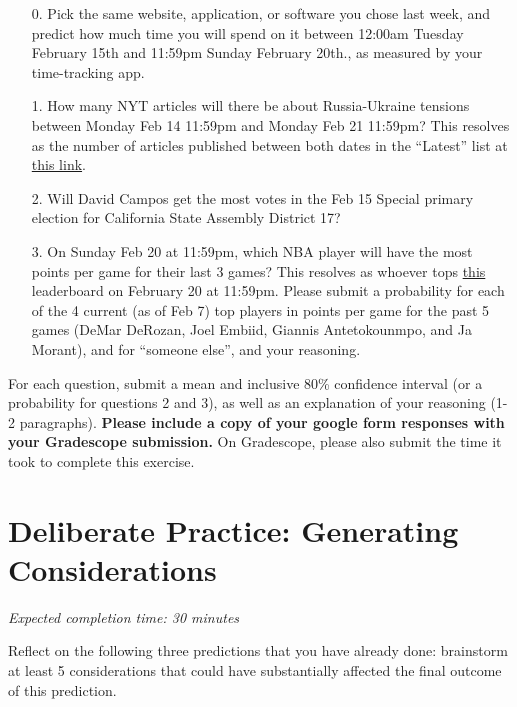 \documentclass[11pt]{article}
\begin{document}
\begin{enumerate}
	\item[0.] Pick the same website, application, or software you chose last week, and predict how much time you will spend on it between 12:00am Tuesday February 15th and 11:59pm Sunday February 20th., as measured by your time-tracking app.

	\item[1.] How many NYT articles will there be about Russia-Ukraine tensions between Monday Feb 14 11:59pm and Monday Feb 21 11:59pm? This resolves as the number of articles published between both dates in the ``Latest'' list at \href{https://www.nytimes.com/news-event/ukraine-russia?name=styln-russia-ukraine&region=TOP_BANNER&block=storyline_menu_recirc&action=click&pgtype=LegacyCollection&variant=0_Control}{this link}.
	
	\item[2.] Will David Campos get the most votes in the Feb 15 Special primary election for California State Assembly District 17?
 
	\item[3.] On Sunday Feb 20 at 11:59pm, which NBA player will have the most points per game for their last 3 games? This resolves as whoever tops \href{https://www.nba.com/stats/players/traditional/?sort=PTS&dir=-1&Season=2021-22&SeasonType=Regular%20Season&LastNGames=3}{this} leaderboard on February 20 at 11:59pm. Please submit a probability for each of the 4 current (as of Feb 7) top players in points per game for the past 5 games (DeMar DeRozan, Joel Embiid, Giannis Antetokounmpo, and Ja Morant), and for ``someone else'', and your reasoning. 
\end{enumerate}

For each question, submit a mean and inclusive 80\% confidence interval (or a probability for questions 2 and 3), as well as an explanation of your reasoning (1-2 paragraphs). \textbf{Please include a copy of your google form responses with your Gradescope submission.} On Gradescope, please also submit the time it took to complete this exercise.

\section*{Deliberate Practice: Generating Considerations}

\emph{Expected completion time: 30 minutes}

Reflect on the following three predictions that you have already done: brainstorm at least 5 considerations that could have substantially affected the final outcome of this prediction.
\end{document}

